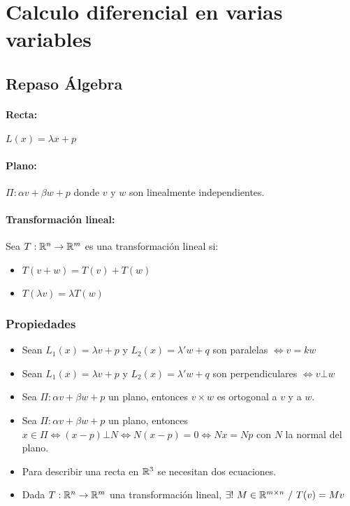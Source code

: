 \newpage
\section{Calculo diferencial en varias variables}
\subsection{Repaso Álgebra}
\paragraph{Recta:} $L(x) = \lambda x + p$

\paragraph{Plano:} $\Pi: \alpha v + \beta w + p$ donde $v$ y $w$ son linealmente independientes.

\paragraph{Transformación lineal:} Sea $T:\mathbb{R}^n\to\mathbb{R}^m$ es una transformación lineal si:
\begin{itemize}
\item $T(v+w) = T(v) + T(w)$
\item $T(\lambda v) = \lambda T(w)$
\end{itemize}

\subsubsection{Propiedades}
\begin{itemize}[resume]
\item Sean $L_1(x) = \lambda v + p$ y $L_2(x) = \lambda'w + q$ son paralelas $\iff v=kw$ 
\item Sean $L_1(x) = \lambda v + p$ y $L_2(x) = \lambda'w + q$ son perpendiculares $\iff v\bot w$
\item Sea $\Pi: \alpha v + \beta w + p$ un plano, entonces $v\times w$ es ortogonal a $v$ y a $w$.
\item Sea $\Pi: \alpha v + \beta w + p$ un plano, entonces $x\in\Pi\iff(x-p)\bot N\iff N(x-p)=0 \iff Nx = Np$ con $N$ la normal del plano.
\item Para describir una recta en $\mathbb{R}^3$ se necesitan dos ecuaciones.
\item Dada $T:\mathbb{R}^n\to\mathbb{R}^m$ una transformación lineal, $\exists!~M\in\mathbb{R}^{m\times n}~/~T(v) = Mv$
\end{itemize}

